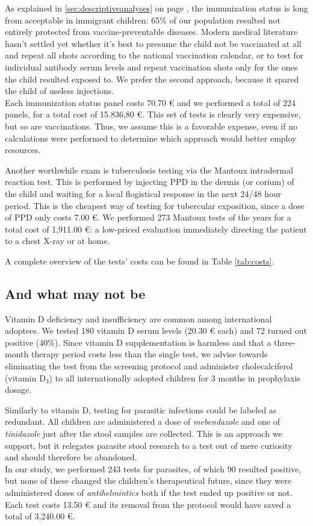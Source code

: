 As explained in \ref{sec:descriptiveanalyses} on page \pageref{sec:descriptiveanalyses}, the immunization status is long from acceptable in immigrant children: 65\% of our population resulted not entirely protected from vaccine-preventable diseases. Modern medical literature hasn't settled yet whether it's best to presume the child not be vaccinated at all and repeat all shots according to the national vaccination calendar, or to test for individual antibody serum levels and repeat vaccination shots only for the ones the child resulted exposed to. We prefer the second approach, because it spared the child of useless injections.\\
Each immunization status panel costs 70.70 € and we performed a total of 224 panels, for a total cost of 15.836,80 €. This set of tests  is clearly very expensive, but so are vaccinations. Thus, we assume this is a favorable expense, even if no calculations were performed to determine which approach would better employ resources.

Another worthwhile exam is tuberculosis testing via the Mantoux intradermal reaction test. This is performed by injecting PPD in the dermis (or corium) of the child and waiting for a local flogistical response in the next 24/48 hour period. This is the cheapest way of testing for tubercular exposition, since a dose of PPD only costs 7.00 €. We performed 273 Mantoux tests of the years for a total cost of 1,911.00 €: a low-priced evaluation immediately directing the patient to a chest X-ray or at home.

A complete overview of the tests' costs can be found in Table \ref{tab:costs}.

\subsection{And what may not be}\label{sub:notworthwhile}
Vitamin D deficiency and insufficiency are common among international adoptees. We tested 180 vitamin D serum levels (20.30 € each) and 72 turned out positive (40\%). Since vitamin D supplementation is harmless and that a three-month therapy period costs less than the single test, we advise towards eliminating the test from the screening protocol and administer cholecalciferol (vitamin D$_3$) to all internationally adopted children for 3 months in prophylaxis dosage.

Similarly to vitamin D, testing for parasitic infections could be labeled as redundant. All children are administered a dose of \textit{mebendazole} and one of \textit{tinidazole} just after the stool samples are collected. This is an approach we support, but it relegates parasite stool research to a test out of mere curiosity and should therefore be abandoned.\\
In our study, we performed 243 tests for parasites, of which 90 resulted positive, but none of these changed the children's therapeutical future, since they were administered doses of \textit{antihelmintics} both if the test ended up positive or not. Each test costs 13.50 € and its removal from the protocol would have saved a total of 3,240.00 €.

